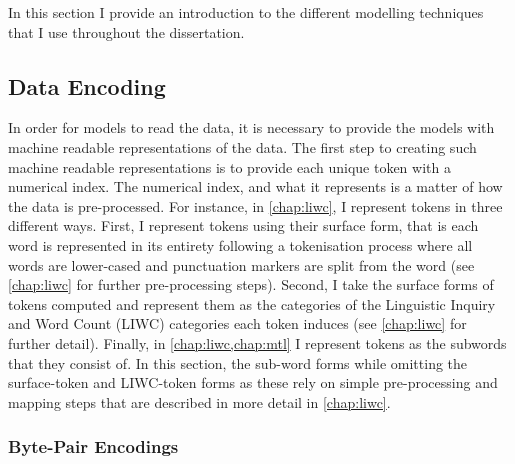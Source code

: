 In this section I provide an introduction to the different modelling techniques that I use throughout the dissertation.

\subsection{Data Encoding}

In order for models to read the data, it is necessary to provide the models with machine readable representations of the data. The first step to creating such machine readable representations is to provide each unique token with a numerical index.
The numerical index, and what it represents is a matter of how the data is pre-processed. For instance, in \cref{chap:liwc}, I represent tokens in three different ways. 
First, I represent tokens using their surface form, that is each word is represented in its entirety following a tokenisation process where all words are lower-cased and punctuation markers are split from the word (see \cref{chap:liwc} for further pre-processing steps). Second, I take the surface forms of tokens computed and represent them as the categories of the Linguistic Inquiry and Word Count (LIWC) categories each token induces (see \cref{chap:liwc} for further detail). Finally, in \cref{chap:liwc,chap:mtl} I represent tokens as the subwords that they consist of. 
In this section, the sub-word forms while omitting the surface-token and LIWC-token forms as these rely on simple pre-processing and mapping steps that are described in more detail in \cref{chap:liwc}.

\subsubsection{Byte-Pair Encodings}

